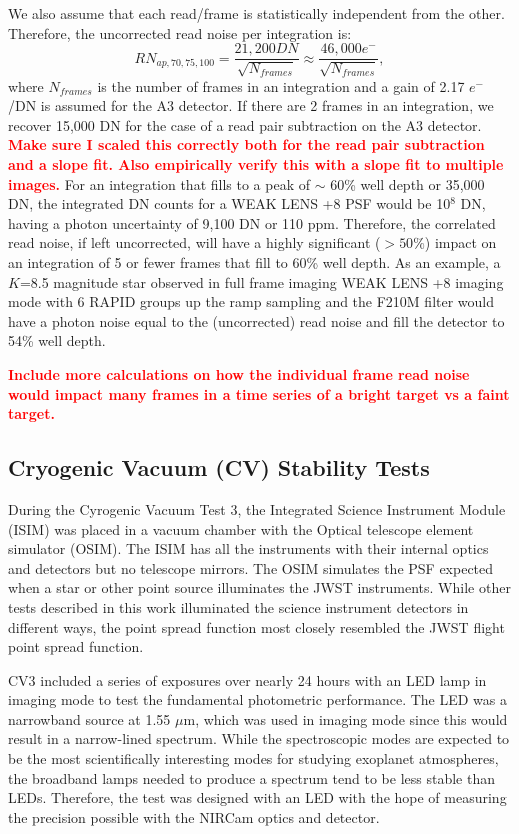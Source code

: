 \documentclass{aastex62}
\begin{document}
We also assume that each read/frame is statistically independent from the other.
Therefore, the uncorrected read noise per integration is:
\begin{equation}
RN_{ap,70,75,100} = \frac{21,200 DN}{ \sqrt{N_{frames}}} \approx \frac{46,000 e^-}{ \sqrt{N_{frames}}},
\end{equation}
where $N_{frames}$ is the number of frames in an integration and a gain of 2.17 $e^-$/DN is assumed for the A3 detector.
If there are 2 frames in an integration, we recover 15,000 DN for the case of a read pair subtraction on the A3 detector.
\textcolor{red}{\bf Make sure I scaled this correctly both for the read pair subtraction and a slope fit. Also empirically verify this with a slope fit to multiple images.}
For an integration that fills to a peak of $\sim$ 60\% well depth or 35,000 DN, the integrated DN counts for a WEAK LENS +8 PSF would be 10$^8$ DN, having a photon uncertainty of 9,100 DN or 110 ppm.
Therefore, the correlated read noise, if left uncorrected, will have a highly significant ($>50\%$) impact on an integration of 5 or fewer frames that fill to 60\% well depth.
As an example, a $K$=8.5 magnitude star observed in full frame imaging WEAK LENS +8 imaging mode with 6 RAPID groups up the ramp sampling and the F210M filter would have a photon noise equal to the (uncorrected) read noise and fill the detector to 54\% well depth.


\textcolor{red}{\bf Include more calculations on how the individual frame read noise would impact many frames in a time series of a bright target vs a faint target.}

\subsection{Cryogenic Vacuum (CV) Stability Tests}

During the Cyrogenic Vacuum Test 3, the Integrated Science Instrument Module (ISIM) was placed in a vacuum chamber with the Optical telescope element simulator (OSIM).
The ISIM has all the instruments with their internal optics and detectors but no telescope mirrors.
The OSIM simulates the PSF expected when a star or other point source illuminates the JWST instruments.
While other tests described in this work illuminated the science instrument detectors in different ways, the point spread function most closely resembled the JWST flight point spread function.

CV3 included a series of exposures over nearly 24 hours with an LED lamp in imaging mode to test the fundamental photometric performance.
The LED was a narrowband source at 1.55 $\mu$m, which was used in imaging mode since this would result in a narrow-lined spectrum.
While the spectroscopic modes are expected to be the most scientifically interesting modes for studying exoplanet atmospheres, the broadband lamps needed to produce a spectrum tend to be less stable than LEDs.
Therefore, the test was designed with an LED with the hope of measuring the precision possible with the NIRCam optics and detector.
\end{document}
